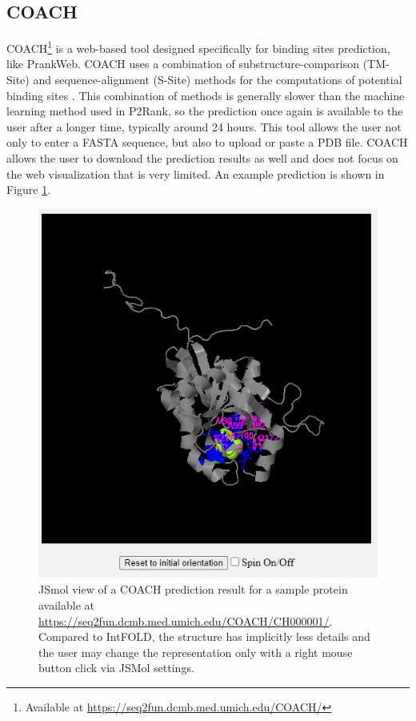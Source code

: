 \subsection{COACH}
\label{subsec:coach}

COACH\footnote{Available at \url{https://seq2fun.dcmb.med.umich.edu/COACH/}} is a web-based tool designed specifically for binding sites prediction, like PrankWeb. COACH uses a combination of substructure-comparison (TM-Site) and sequence-alignment (S-Site) methods for the computations of potential binding sites \cite{yang2013protein}. This combination of methods is generally slower than the machine learning method used in P2Rank, so the prediction once again is available to the user after a longer time, typically around 24 hours. This tool allows the user not only to enter a FASTA sequence, but also to upload or paste a PDB file. COACH allows the user to download the prediction results as well and does not focus on the web visualization that is very limited. An example prediction is shown in Figure \ref{fig:coach_prediction}.

\begin{figure}
    \centering
    \includegraphics[width=.75\linewidth]{img/coach_prediction.png}
    \caption{JSmol view of a COACH prediction result for a sample protein available at \url{https://seq2fun.dcmb.med.umich.edu/COACH/CH000001/}. Compared to IntFOLD, the structure has implicitly less details and the user may change the representation only with a right mouse button click via JSMol settings.}
    \label{fig:coach_prediction}
\end{figure}


